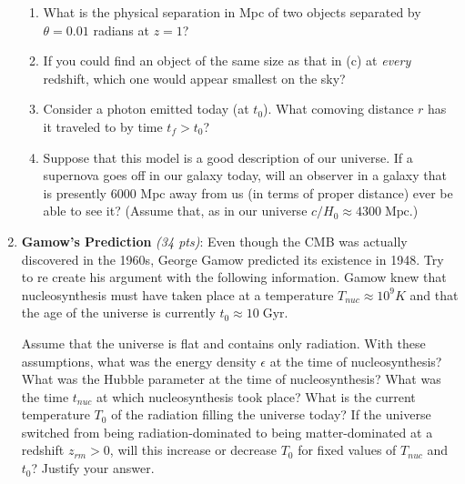 \documentclass[12pt,preprint]{aastex}
\begin{document}
\begin{enumerate}
\begin{enumerate}
	\item What is the physical separation in Mpc of two objects separated by $\theta = 0.01$ radians at $z = 1$?
	
	\item If you could find an object of the same size as that in (c) at \textit{every} redshift, which one would appear smallest on the sky?
	
	\item Consider a photon emitted today (at $t_0$). What comoving distance $r$ has it traveled to by time $t_f >t _0$?
	
	\item Suppose that this model is a good description of our universe. If a supernova goes off in our galaxy today, will an observer in a galaxy that is presently 6000 Mpc away from us (in terms of proper distance) ever be able to see it? (Assume that, as in our universe $c/H_0 \approx 4300\; \mathrm{Mpc}$.)
\end{enumerate}

\item \textbf{Gamow's Prediction} \textit{(34 pts)}: 
	Even though the CMB was actually discovered in the 1960s, George Gamow predicted its existence in 1948. Try to re create his argument with the following information. Gamow knew that nucleosynthesis must have taken place at a temperature $T_{nuc} \approx 10^9 K$ and that the age of the universe is currently $t_0 \approx 10\; \mathrm{Gyr} $.
	
	Assume that the universe is flat and contains only radiation. With these assumptions, what was the energy density $\epsilon$ at the time of nucleosynthesis? What was the Hubble parameter at the time of nucleosynthesis? What was the time $t_{nuc}$ at which nucleosynthesis took place? What is the current temperature $T_0$ of the radiation filling the universe today? If the universe switched from being radiation-dominated to being matter-dominated at a redshift $z_{rm} > 0$, will this increase or decrease $T_0$ for fixed values of $T_{nuc}$ and $t_0$? Justify your answer.
\end{enumerate}
\end{document}
